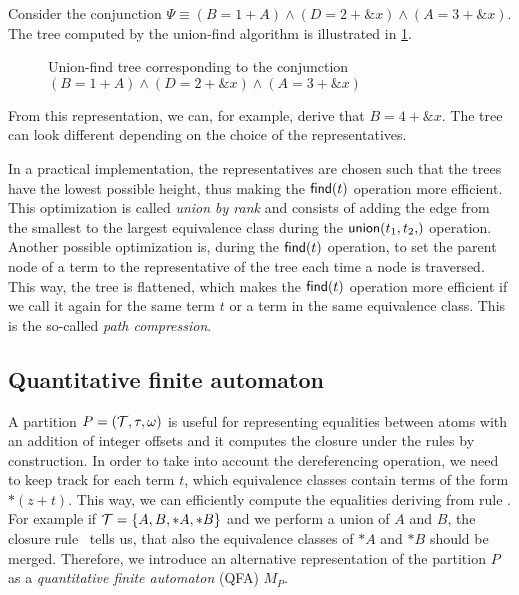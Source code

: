 \begin{example}
  Consider the conjunction $\Psi \equiv (B = 1 + A) \land (D = 2 + \&x) \land (A = 3 + \&x)$.
  The tree computed by the union-find algorithm is illustrated in \cref{fig:uf-tree}.
  \begin{figure}
    \caption{Union-find tree corresponding to the conjunction  $(B = 1 + A) \land (D = 2 + \&x) \land (A = 3 + \&x)$}\label{fig:uf-tree}
  \end{figure}
  From this representation, we can, for example, derive that $B = 4 + \&x$.
  The tree can look different depending on the choice of the representatives.
\end{example}

In a practical implementation, the representatives are chosen such that the trees have the lowest possible height, thus making the $\textsf{find}(t)$ operation more efficient.
This optimization is called \emph{union by rank} and consists of adding the edge from the smallest to the largest equivalence class during the $\union{t_1}{t_2}$ operation.
Another possible optimization is, during the $\textsf{find}(t)$ operation, to set the parent node of a term to the representative of the tree each time a node is traversed.
This way, the tree is flattened, which makes the $\textsf{find}(t)$ operation
more efficient if we call it again for the same term $t$ or a term in the same equivalence class.
This is the so-called \emph{path compression}.~\cite{uf-tarjan}
\subsection{Quantitative finite automaton}\label{subsection:qfa}

A partition $P = (\mathcal{T}, \tau, \omega)$ is useful for representing equalities between atoms
with an addition of integer offsets and it computes the closure under the rules
by construction.
In order to take into account the dereferencing operation, we need to
keep track for each term $t$, which equivalence classes contain terms of the form $*(z+t)$.
This way, we can efficiently compute the equalities deriving from rule .
For example if $\mathcal{T} = \{A, B, *A, *B\}$ and we perform a union of $A$ and $B$, the
closure rule~ tells us, that also the equivalence classes of $*A$ and $*B$ should be merged.
Therefore, we introduce an alternative representation of the partition $P$ as a \emph{quantitative finite automaton} (QFA) $M_P$.

